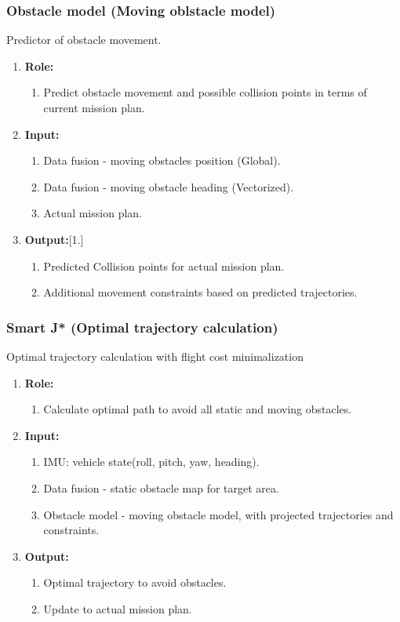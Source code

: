 \subsubsection{Obstacle model (Moving oblstacle model)}
Predictor of obstacle movement.
	\begin{enumerate}[]
	\item \textbf{Role:}
		\begin{enumerate}[]
		\item Predict obstacle movement and possible collision points in terms of current mission plan. 
		\end{enumerate}
	\item \textbf{Input:}
		\begin{enumerate}[1.]
		\item Data fusion - moving obstacles position (Global). 
		\item Data fusion - moving obstacle heading (Vectorized).
		\item Actual mission plan.
		\end{enumerate}
	\item \textbf{Output:}[1.]
		\begin{enumerate}
		\item Predicted Collision points for actual mission plan.
		\item Additional movement constraints based on predicted trajectories.
		\end{enumerate}
	\end{enumerate}

\subsubsection{Smart J* (Optimal trajectory calculation)}
	Optimal trajectory calculation with flight cost minimalization
	\begin{enumerate}[]
	\item \textbf{Role:}
		\begin{enumerate}[]
		\item Calculate optimal path to avoid all static and moving obstacles. 
		\end{enumerate}
	\item \textbf{Input:}
		\begin{enumerate}[1.]
		\item IMU: vehicle state(roll, pitch, yaw, heading).
		\item Data fusion - static obstacle map for target area.
		\item Obstacle model - moving obstacle model, with projected trajectories and constraints.
		\end{enumerate}
	\item \textbf{Output:}
		\begin{enumerate}[1.]
		\item Optimal trajectory to avoid obstacles.
		\item Update to actual mission plan.
		\end{enumerate}
	\end{enumerate}
	
